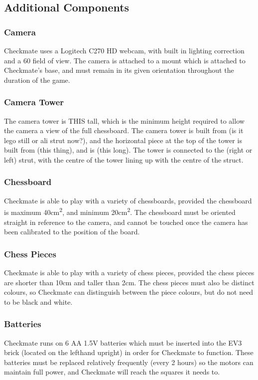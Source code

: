 \documentclass[onecolumn]{IEEEtran}
\begin{document}
\subsection{Additional Components}
\subsubsection{Camera}
Checkmate uses a Logitech C270 HD webcam, with built in lighting correction and a 60\textdegree\: field of view. The camera is attached to a mount which is attached to Checkmate's base, and must remain in its given orientation throughout the duration of the game. 
\subsubsection{Camera Tower}
The camera tower is THIS tall, which is the minimum height required to allow the camera a view of the full chessboard. The camera tower is built from (is it lego still or ali strut now?), and the horizontal piece at the top of the tower is built from (this thing), and is (this long). The tower is connected to the (right or left) strut, with the centre of the tower lining up with the centre of the struct. 
\subsubsection{Chessboard}
Checkmate is able to play with a variety of chessboards, provided the chessboard is maximum 40cm\textsuperscript{2}, and minimum 20cm\textsuperscript{2}. The chessboard must be oriented straight in reference to the camera, and cannot be touched once the camera has been calibrated to the position of the board. 
\subsubsection{Chess Pieces}
Checkmate is able to play with a variety of chess pieces, provided the chess pieces are shorter than 10cm and taller than 2cm. The chess pieces must also be distinct colours, so Checkmate can distinguish between the piece colours, but do not need to be black and white. 
\subsubsection{Batteries}
Checkmate runs on 6 AA 1.5V batteries which must be inserted into the EV3 brick (located on the lefthand upright) in order for Checkmate to function. These batteries must be replaced relatively frequently (\texttildelow every 2 hours) so the motors can maintain full power, and Checkmate will reach the squares it needs to. 
\end{document}
